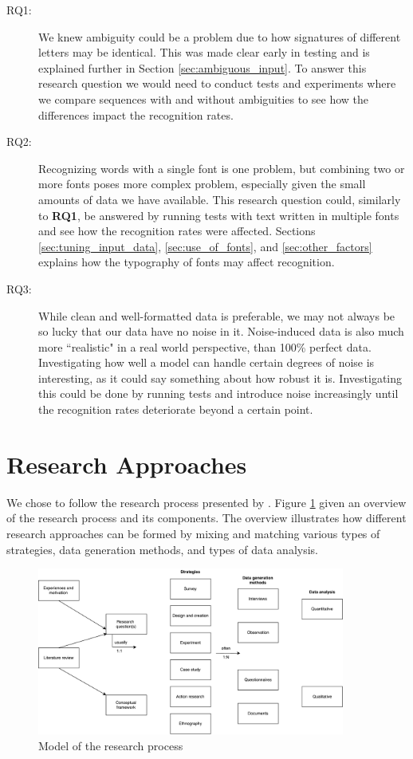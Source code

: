 \begin{description}
    \item[RQ1:]{We knew ambiguity could be a problem due to how signatures of different letters may be identical. This was made clear early in testing and is explained further in Section \ref{sec:ambiguous_input}. To answer this research question we would need to conduct tests and experiments where we compare sequences with and without ambiguities to see how the differences impact the recognition rates.}
    \item[RQ2:]{Recognizing words with a single font is one problem, but combining two or more fonts poses more complex problem, especially given the small amounts of data we have available. This research question could, similarly to \textbf{RQ1}, be answered by running tests with text written in multiple fonts and see how the recognition rates were affected. Sections \ref{sec:tuning_input_data}, \ref{sec:use_of_fonts}, and \ref{sec:other_factors} explains how the typography of fonts may affect recognition.}
    \item[RQ3:]{While clean and well-formatted data is preferable, we may not always be so lucky that our data have no noise in it. Noise-induced data is also much more ``realistic" in a real world perspective, than 100\% perfect data. Investigating how well a model can handle certain degrees of noise is interesting, as it could say something about how robust it is. Investigating this could be done by running tests and introduce noise increasingly until the recognition rates deteriorate beyond a certain point.}
\end{description}


\section{Research Approaches}
We chose to follow the research process presented by \citep{oates2005researching}. Figure \ref{fig:model_research_process} given an overview of the research process and its components. The overview illustrates how different research approaches can be formed by mixing and matching various types of strategies, data generation methods, and types of data analysis.

\begin{figure}[ht]
    \centering
    \includegraphics[width=0.9\textwidth]{fig/methodology/research_strategies.pdf}
    \caption{Model of the research process}
    \label{fig:model_research_process}
\end{figure}

